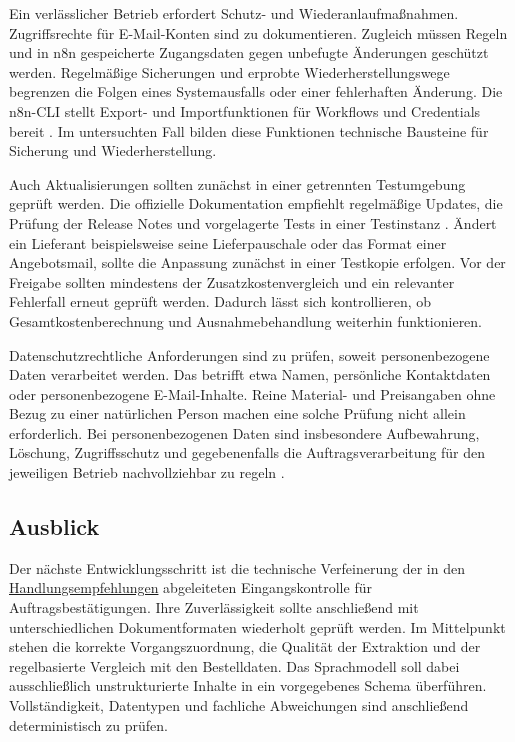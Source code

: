 \documentclass[a4paper,12pt]{article}
\begin{document}
Ein verlässlicher Betrieb erfordert Schutz- und Wiederanlaufmaßnahmen. Zugriffsrechte für E-Mail-Konten sind zu dokumentieren. Zugleich müssen Regeln und in n8n gespeicherte Zugangsdaten gegen unbefugte Änderungen geschützt werden. Regelmäßige Sicherungen und erprobte Wiederherstellungswege begrenzen die Folgen eines Systemausfalls oder einer fehlerhaften Änderung. Die n8n-CLI stellt Export- und Importfunktionen für Workflows und Credentials bereit \parencite{n8n_docs_2026}. Im untersuchten Fall bilden diese Funktionen technische Bausteine für Sicherung und Wiederherstellung.

Auch Aktualisierungen sollten zunächst in einer getrennten Testumgebung geprüft werden. Die offizielle Dokumentation empfiehlt regelmäßige Updates, die Prüfung der Release Notes und vorgelagerte Tests in einer Testinstanz \parencite{n8n_docs_2026}. Ändert ein Lieferant beispielsweise seine Lieferpauschale oder das Format einer Angebotsmail, sollte die Anpassung zunächst in einer Testkopie erfolgen. Vor der Freigabe sollten mindestens der Zusatzkostenvergleich und ein relevanter Fehlerfall erneut geprüft werden. Dadurch lässt sich kontrollieren, ob Gesamtkostenberechnung und Ausnahmebehandlung weiterhin funktionieren.

Datenschutzrechtliche Anforderungen sind zu prüfen, soweit personenbezogene Daten verarbeitet werden. Das betrifft etwa Namen, persönliche Kontaktdaten oder personenbezogene E-Mail-Inhalte. Reine Material- und Preisangaben ohne Bezug zu einer natürlichen Person machen eine solche Prüfung nicht allein erforderlich. Bei personenbezogenen Daten sind insbesondere Aufbewahrung, Löschung, Zugriffsschutz und gegebenenfalls die Auftragsverarbeitung für den jeweiligen Betrieb nachvollziehbar zu regeln \parencite{eu_dsgvo_2016}.

\subsection{Ausblick}
Der nächste Entwicklungsschritt ist die technische Verfeinerung der in den \hyperref[sec:handlungsempfehlungen-kku]{Handlungsempfehlungen} abgeleiteten Eingangskontrolle für Auftragsbestätigungen. Ihre Zuverlässigkeit sollte anschließend mit unterschiedlichen Dokumentformaten wiederholt geprüft werden. Im Mittelpunkt stehen die korrekte Vorgangszuordnung, die Qualität der Extraktion und der regelbasierte Vergleich mit den Bestelldaten. Das Sprachmodell soll dabei ausschließlich unstrukturierte Inhalte in ein vorgegebenes Schema überführen. Vollständigkeit, Datentypen und fachliche Abweichungen sind anschließend deterministisch zu prüfen.
\end{document}
